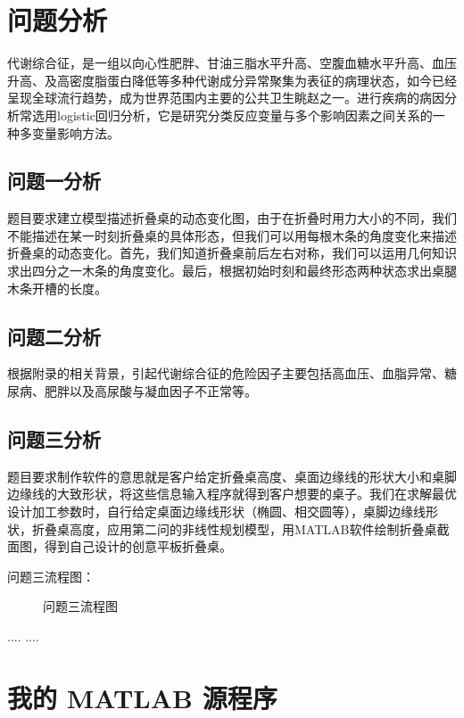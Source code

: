 \documentclass[bwprint]{cumcmthesis}
\begin{document}
\section{问题分析}
代谢综合征，是一组以向心性肥胖、甘油三脂水平升高、空腹血糖水平升高、血压升高、及高密度脂蛋白降低等多种代谢成分异常聚集为表征的病理状态，如今已经呈现全球流行趋势，成为世界范围内主要的公共卫生眺赵之一。进行疾病的病因分析常选用logistic回归分析，它是研究分类反应变量与多个影响因素之间关系的一种多变量影响方法。
\subsection{问题一分析}
题目要求建立模型描述折叠桌的动态变化图，由于在折叠时用力大小的不同，我们不能描述在某一时刻折叠桌的具体形态，但我们可以用每根木条的角度变化来描述折叠桌的动态变化。首先，我们知道折叠桌前后左右对称，我们可以运用几何知识求出四分之一木条的角度变化。最后，根据初始时刻和最终形态两种状态求出桌腿木条开槽的长度。
\subsection{问题二分析}
根据附录的相关背景，引起代谢综合征的危险因子主要包括高血压、血脂异常、糖尿病、肥胖以及高尿酸与凝血因子不正常等。
\subsection{问题三分析}
题目要求制作软件的意思就是客户给定折叠桌高度、桌面边缘线的形状大小和桌脚边缘线的大致形状，将这些信息输入程序就得到客户想要的桌子。我们在求解最优设计加工参数时，自行给定桌面边缘线形状（椭圆、相交圆等），桌脚边缘线形状，折叠桌高度，应用第二问的非线性规划模型，用MATLAB软件绘制折叠桌截面图，得到自己设计的创意平板折叠桌。

问题三流程图：
\begin{figure}[!h]
\centering
\caption{问题三流程图}
\end{figure}
\begin{thebibliography}{9}
  ....
  ....
\end{thebibliography}
\appendix
\section{我的 MATLAB 源程序}
\end{document}
